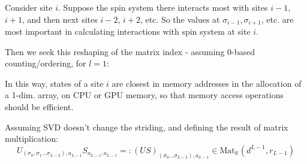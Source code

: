 \documentclass[10pt]{amsart}
\begin{document}
\begin{multicols*}{2}
Consider site $i$.  Suppose the spin system there interacts most with sites $i-1$, $i+1$, and then next sites $i-2$, $i+2$, etc.  So the values at $\sigma_{i-1}, \sigma_{i+1}$, etc. are most important in calculating interactions with spin system at site $i$.  

Then we seek this reshaping of the matrix index - assuming $0$-based counting/ordering, for $l=1$:

In this way, states of a site $i$ are closest in memory addresses in the allocation of a 1-dim. array, on CPU or GPU memory, so that memory access operations should be efficient.  

Assuming SVD doesn't change the striding, and defining the result of matrix multiplication:
\[
U_{(\sigma_0, \sigma_1 \dots \sigma_{L-2}), a_{L-1} } S_{a_{L-1}, a_{L-1}} =: (US)_{(\sigma_0 \dots \sigma_{L-2} ), a_{L-1} } \in \text{Mat}_{\mathbb{K}}(d^{L-1},r_{L-1} )
\]


\end{multicols*}
\end{document}
